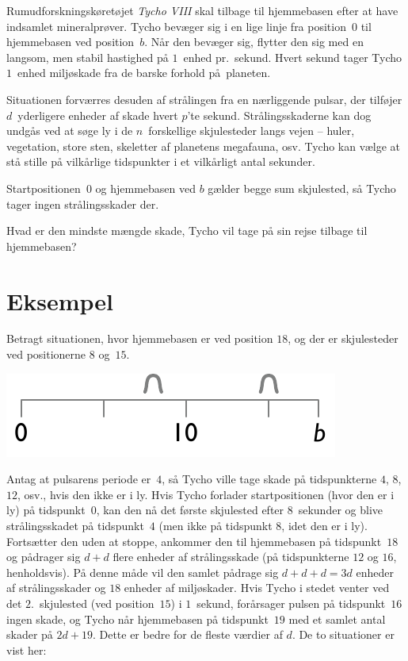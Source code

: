 

\noindent
Rum\-udforsknings\-køretøjet \emph{Tycho VIII} skal tilbage til hjemmebasen efter at have indsamlet mineralprøver.
Tycho bevæger sig i en lige linje fra position~$0$ til hjemmebasen ved position~$b$.
Når den bevæger sig, flytter den sig med en langsom, men stabil hastighed på $1$~enhed pr.\ sekund.
Hvert sekund tager Tycho $1$~enhed miljøskade fra de barske forhold på planeten.

Situationen forværres desuden af strålingen fra en nærliggende pulsar, der tilføjer $d$~yderligere enheder af skade hvert $p$'te sekund.
Strålingsskaderne kan dog undgås ved at søge ly i de $n$~forskellige skjulesteder langs vejen -- huler, vegetation, store sten, skeletter af planetens megafauna, osv.
Tycho kan vælge at stå stille på vilkårlige tidspunkter i et vilkårligt antal sekunder.

Startpositionen~$0$ og hjemmebasen ved $b$ gælder begge sum skjulested, så Tycho tager ingen strålingsskader der.

\medskip
Hvad er den mindste mængde skade, Tycho vil tage på sin rejse tilbage til hjemmebasen?

\section*{Eksempel}

Betragt situationen, hvor hjemmebasen er ved position $18$, og der er skjulesteder ved positionerne $8$ og~$15$.

\includegraphics[width=.3\textwidth]{img/samplesetup}

Antag at pulsarens periode er~$4$, så Tycho ville tage skade på tidspunkterne $4$, $8$, $12$, osv., hvis den ikke er i ly.
Hvis Tycho forlader startpositionen (hvor den er i ly) på tidspunkt~$0$, kan den nå det første skjulested efter $8$~sekunder og blive strålingsskadet på tidspunkt~$4$ (men ikke på tidspunkt $8$, idet den er i ly).
Fortsætter den uden at stoppe, ankommer den til hjemmebasen på tidspunkt~$18$ og pådrager sig $d+d$ flere enheder af strålingsskade (på tidspunkterne $12$ og $16$, henholdsvis).
På denne måde vil den samlet pådrage sig $d+d+d=3d$ enheder af strålingsskader og $18$ enheder af miljøskader.
Hvis Tycho i stedet venter ved det $2$.~skjulested (ved position~$15$) i $1$~sekund, forårsager pulsen på tidspunkt~$16$ ingen skade, og Tycho når hjemmebasen på tidspunkt~$19$ med et samlet antal skader på $2d + 19$.
Dette er bedre for de fleste værdier af $d$.
De to situationer er vist her:

